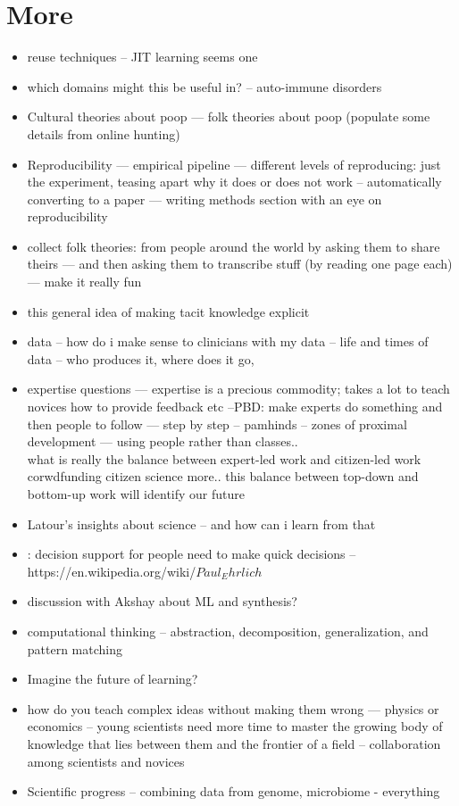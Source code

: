 \section{More} 

\begin{itemize}
\item reuse techniques -- JIT learning seems one
\item which domains might this be useful in?	
-- auto-immune disorders
\item Cultural theories about poop — folk theories about poop 
(populate some details from online hunting)
\item Reproducibility — empirical pipeline 
— different levels of reproducing: just the experiment, teasing apart why it does or does not work
-- automatically converting to a paper — writing methods section with an eye on reproducibility 
\item collect folk theories: from people around the world by asking them to share theirs
— and then asking them to transcribe stuff (by reading one page each) — make it really fun
\item this general idea of making tacit knowledge explicit 
\item data -- how do i make sense to clinicians with my data -- life and times of data -- who produces it, where does it go, 
\item expertise questions --- expertise is a precious commodity; takes a lot to teach novices how to provide feedback etc  --PBD: make experts do something and then people to follow — step by step -- pamhinds -- zones of proximal development — using people rather than classes.. \\
 what is really the balance between expert-led work and citizen-led work
    corwdfunding
    citizen science
    more.. 
this balance between top-down and bottom-up work will identify our future
\item Latour's insights about science -- and how can i learn from that
\item : decision support for people need to make quick decisions -- https://en.wikipedia.org/wiki/$Paul_Ehrlich$
\item discussion with Akshay about ML and synthesis?
\item computational thinking -- abstraction, decomposition, generalization, and pattern matching
\item Imagine the future of learning?
\item how do you teach complex ideas without making them wrong 
    — physics or economics
-- young scientists need more time to master the growing body of knowledge that lies between them and the frontier of a field -- collaboration among scientists and novices
\item Scientific progress -- combining data from genome, microbiome - everything
\end{itemize}

